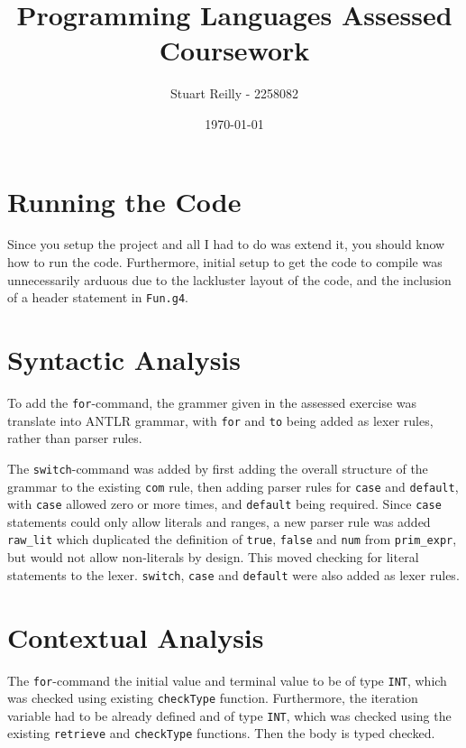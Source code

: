 \documentclass[11pt]{article}
\author{Stuart Reilly - 2258082}
\title{Programming Languages Assessed Coursework}
\date{\today}
\begin{document}
    \maketitle

    \section{Running the Code}\label{sec:running-the-code}
    Since you setup the project and all I had to do was extend it, you should know how to run the code.
    Furthermore, initial setup to get the code to compile was unnecessarily arduous due to the lackluster layout of the
    code, and the inclusion of a header statement in \texttt{Fun.g4}.

    \section{Syntactic Analysis}\label{sec:syntactic-analysis}
    To add the \texttt{for}-command, the grammer given in the assessed exercise was translate into ANTLR grammar, with
    \texttt{for} and \texttt{to} being added as lexer rules, rather than parser rules.

    The \texttt{switch}-command was added by first adding the overall structure of the grammar to the existing
    \texttt{com} rule, then adding parser rules for \texttt{case} and \texttt{default}, with \texttt{case} allowed
    zero or more times, and \texttt{default} being required.
    Since \texttt{case} statements could only allow literals and ranges, a new parser rule was added \texttt{raw\_lit}
    which duplicated the definition of \texttt{true}, \texttt{false} and \texttt{num} from \texttt{prim\_expr}, but would
    not allow non-literals by design.
    This moved checking for literal statements to the lexer.
    \texttt{switch}, \texttt{case} and \texttt{default} were also added as lexer rules.

    \section{Contextual Analysis}\label{sec:contextual-analysis}
    The \texttt{for}-command the initial value and terminal value to be of type \texttt{INT}, which was checked using
    existing \texttt{checkType} function.
    Furthermore, the iteration variable had to be already defined and of type \texttt{INT}, which was checked using the
    existing \texttt{retrieve} and \texttt{checkType} functions.
    Then the body is typed checked.
\end{document}
